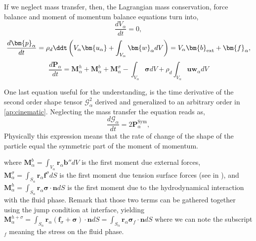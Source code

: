 If we neglect mass transfer, 
then, the Lagrangian mass conservation, force balance and moment of momentum balance equations turn into,
\begin{equation}
    \label{eq:massdef}
    \frac{d V_\alpha}{dt} 
    = 0,
\end{equation}
\begin{equation}
    \label{eq:momentumdef}
    \frac{d \bm{p}_\alpha}{dt} 
    = \rho_d \ddt  \left(V_\alpha \bm{u_\alpha} 
    + \int_{V_\alpha} \bm{w}_\alpha dV\right)
    = V_\alpha\bm{b}_{\text{ext}} 
    + \bm{f}_\alpha,
\end{equation}
\begin{equation}
    \label{eq:momentMumdef}
    \frac{d\bm{P}_\alpha}{dt} 
    = \bm{M}_\alpha^{h}
    + \bm{M}_\alpha^{b}
    + \bm{M}_\alpha^\sigma
    - \int_{V_\alpha} \bm{\sigma} dV
    + \rho_d\int_{V_\alpha} \bm{u}\bm{w}_\alpha dV
\end{equation}




One last equation useful for the understanding, is the time derivative of the second order shape tensor $\mathcal{G}^2_\alpha$ derived and generalized to an arbitrary order in \ref{ap:cinematic}. 
Neglecting the mass transfer the equation reads as,
\begin{equation}
    \frac{d \mathcal{G}_\alpha}{dt} 
    = 2 \bm{P}_\alpha^{\text{Sym}},
\end{equation}
Physically this expression means that the rate of change of the shape of the particle equal the symmetric part of the moment of momentum. 



where $\bm{M}^{b}_\alpha = \int_{V_\alpha}\bm{r}_\alpha \bm{b''}dV$ is the first moment due external forces,
$\bm{M}^{\sigma}_\alpha = \int_{S_\alpha}\bm{r}_\alpha \bm{f}^\sigma dS$ is the first moment due tension surface forces (see in ),
 and $\bm{M}^{h}_\alpha = \int_{S_\alpha}\bm{r}_\alpha \bm{\sigma} \cdot \bm{n} dS$ is the first moment due to the hydrodynamical interaction with the fluid phase. 
Remark that those two terms can be gathered together using the jump condition at interface, yielding
$\bm{M}^{h+\sigma}_\alpha = \int_{S_\alpha} \bm{r}_\alpha (\bm{f}_\sigma + \bm{\sigma}) \cdot \bm{n} dS= \int_{S_\alpha} \bm{r}_\alpha \bm{\sigma}_f \cdot \bm{n} dS$ where we can note the subscript $_f$ meaning the stress on the fluid phase.   


